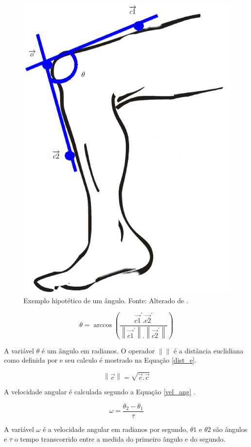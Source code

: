\begin{figure}[H]
	\centering
	\includegraphics[width=14cm]{figuras/leg.eps}
	\caption{Exemplo hipotético de um ângulo. Fonte: Alterado de .}
	\label{leg}
\end{figure}


\begin{equation}
	\label{angulo}
	\theta = \arccos{(\frac{\overrightarrow{c1}^\prime.\overrightarrow{c2}^\prime} 
	{  \left \| \overrightarrow{c1}^\prime \right \|. \left \| \overrightarrow{c2}^\prime \right \|} )} 
\end{equation}

A variável $\theta$ é um ângulo em radianos.
O operador  $\left \| \right \|$ é a distância euclidiana como definida por  e seu calculo é mostrado na Equação \ref{dist_e}.

\begin{equation}
	\label{dist_e}
	  \left \| \overrightarrow{c} \right \|  =  \sqrt{\overrightarrow{c} . \overrightarrow{c}}
\end{equation}

A velocidade angular é calculada segundo a Equação \ref{vel_ang} .


\begin{equation}
	\label{vel_ang}
	\omega =  \frac{\theta_2 - \theta_1}{\tau}
\end{equation}

A variável $\omega$ é a velocidade angular em radianos por segundo, $\theta1$ e $\theta2$ são ângulos e $\tau$ o tempo transcorrido entre a medida do primeiro ângulo e do segundo.


